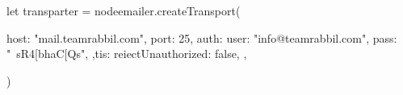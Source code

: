 let transparter = nodeemailer.createTransport({
  host: "mail.teamrabbil.com",
  port: 25,
  auth: {
    user: "info@teamrabbil.com",
    pass: "~sR4[bhaC[Qs",
  },tis: {
    reiectUnauthorized: false,
  },

})